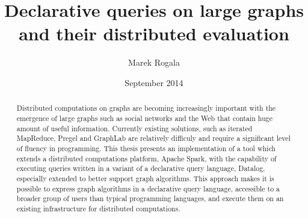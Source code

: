 \documentclass{pracamgr}
\author{Marek Rogala}
\title{Declarative queries on large graphs and their distributed evaluation}
\date{September 2014}
\theoremstyle{plain}
\theoremstyle{definition}
\theoremstyle{remark}
\begin{document}
\maketitle

\begin{abstract}
Distributed computations on graphs are becoming increasingly important with the emergence of large graphs such as social networks and the Web that contain huge amount of useful information.
Currently existing solutions, such as iterated MapReduce, Pregel and GraphLab are relatively difficuly and require a significant level of fluency in programming.
This thesis presents an implementation of a tool which extends a distributed computations platform, Apache Spark, with the capability of executing queries written in a variant of a declarative query language, Datalog, especially extended to better support graph algorithms.
This approach makes it is possible to express graph algorithms in a declarative query language, accessible to a broader group of users than typical programming languages, and execute them on an existing infrastructure for distributed computations.
\end{abstract}

\tableofcontents














\end{document}
